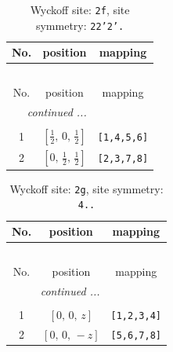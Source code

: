 \documentclass[fleqn,8pt]{jsarticle}
\begin{document}
\renewcommand{\arraystretch}{1.2}
\begin{longtable}{ccc}
\caption{Wyckoff site: {\tt 2f}, site symmetry: {\tt 22'2'.}}
 \\
 \hline \hline
No. & position & mapping \\ \hline \endfirsthead

\multicolumn{2}{l}{\tablename\ \thetable{}} \\
 \hline \hline
No. & position & mapping \\ \hline \endhead

 \hline \hline
\multicolumn{2}{r}{\footnotesize\it continued ...} \\ \endfoot

 \hline \hline
\multicolumn{2}{r}{} \\ \endlastfoot

1 & $\left[ \frac{1}{2},\, 0,\, \frac{1}{2} \right]$ & {\tt [1,4,5,6]} \\ \hline
2 & $\left[ 0,\, \frac{1}{2},\, \frac{1}{2} \right]$ & {\tt [2,3,7,8]} \\
\end{longtable}
\renewcommand{\arraystretch}{1.2}
\begin{longtable}{ccc}
\caption{Wyckoff site: {\tt 2g}, site symmetry: {\tt 4..}}
 \\
 \hline \hline
No. & position & mapping \\ \hline \endfirsthead

\multicolumn{2}{l}{\tablename\ \thetable{}} \\
 \hline \hline
No. & position & mapping \\ \hline \endhead

 \hline \hline
\multicolumn{2}{r}{\footnotesize\it continued ...} \\ \endfoot

 \hline \hline
\multicolumn{2}{r}{} \\ \endlastfoot

1 & $\left[ 0,\, 0,\, z \right]$ & {\tt [1,2,3,4]} \\ \hline
2 & $\left[ 0,\, 0,\, - z \right]$ & {\tt [5,6,7,8]} \\
\end{longtable}
\renewcommand{\arraystretch}{1.2}
\end{document}
